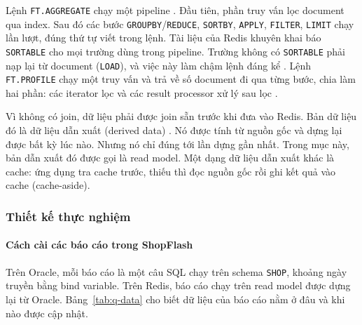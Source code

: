 Lệnh \texttt{FT.AGGREGATE} chạy một pipeline \cite{qRedisFtAggregate, qRedisAggregations}. Đầu tiên, phần truy vấn lọc document qua index. Sau đó các bước \texttt{GROUPBY}/\texttt{REDUCE}, \texttt{SORTBY}, \texttt{APPLY}, \texttt{FILTER}, \texttt{LIMIT} chạy lần lượt, đúng thứ tự viết trong lệnh. Tài liệu của Redis khuyên khai báo \texttt{SORTABLE} cho mọi trường dùng trong pipeline. Trường không có \texttt{SORTABLE} phải nạp lại từ document (\texttt{LOAD}), và việc này làm chậm lệnh đáng kể \cite{qRedisFtAggregate}. Lệnh \texttt{FT.PROFILE} chạy một truy vấn và trả về số document đi qua từng bước, chia làm hai phần: các iterator lọc và các result processor xử lý sau lọc \cite{qRedisFtProfile}.

Vì không có join, dữ liệu phải được join sẵn trước khi đưa vào Redis. Bản dữ liệu đó là dữ liệu dẫn xuất (derived data) \cite{cc-kleppmann2017}. Nó được tính từ nguồn gốc và dựng lại được bất kỳ lúc nào. Nhưng nó chỉ đúng tới lần dựng gần nhất. Trong mục này, bản dẫn xuất đó được gọi là read model. Một dạng dữ liệu dẫn xuất khác là cache: ứng dụng tra cache trước, thiếu thì đọc nguồn gốc rồi ghi kết quả vào cache (cache-aside).

\subsubsection{Thiết kế thực nghiệm}\label{sec:q-design}

\paragraph{Cách cài các báo cáo trong ShopFlash}\label{sec:q-design-app}

Trên Oracle, mỗi báo cáo là một câu SQL chạy trên schema \texttt{SHOP}, khoảng ngày truyền bằng bind variable. Trên Redis, báo cáo chạy trên read model được dựng lại từ Oracle. Bảng~\ref{tab:q-data} cho biết dữ liệu của báo cáo nằm ở đâu và khi nào được cập nhật.

